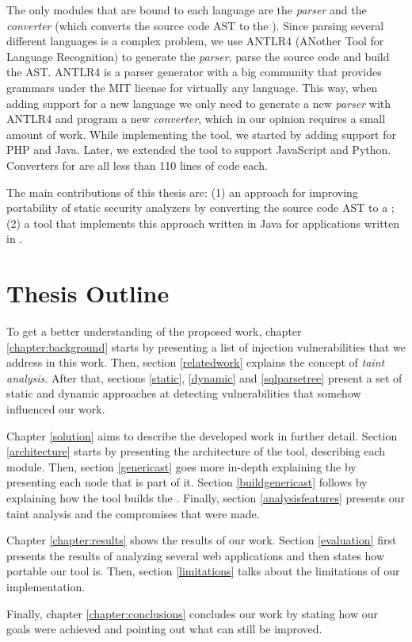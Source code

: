 The only modules that are bound to each language are the \textit{parser} and the \textit{converter} (which converts the source code AST to the \astname{}). Since parsing several different languages is a complex problem, we use ANTLR4 (ANother Tool for Language Recognition) to generate the \textit{parser}, parse the source code and build the AST. ANTLR4 is a parser generator with a big community that provides grammars under the MIT license for virtually any language. This way, when adding support for a new language we only need to generate a new \textit{parser} with ANTLR4 and program a new \textit{converter}, which in our opinion requires a small amount of work. While implementing the \toolname{} tool, we started by adding support for PHP and Java. Later, we extended the tool to support JavaScript and Python. Converters for \implangs{} are all less than 110 lines of code each. 

The main contributions of this thesis are: (1) an approach for improving portability of static security analyzers by converting the source code AST to a \astname{}; (2) a tool that implements this approach written in Java for applications written in \implangs{}.


\section{Thesis Outline}

To get a better understanding of the proposed work, chapter \ref{chapter:background} starts by presenting a list of injection vulnerabilities that we address in this work. Then, section \ref{relatedwork} explains the concept of \textit{taint analysis}. After that, sections \ref{static}, \ref{dynamic} and \ref{sqlparsetree} present a set of static and dynamic approaches at detecting vulnerabilities that somehow influenced our work.

Chapter \ref{solution} aims to describe the developed work in further detail. Section \ref{architecture} starts by presenting the architecture of the \toolname{} tool, describing each module. Then, section \ref{genericast} goes more in-depth explaining the \astname{} by presenting each node that is part of it. Section \ref{buildgenericast} follows by explaining how the \toolname{} tool builds the \astname{}. Finally, section \ref{analysisfeatures} presents our taint analysis and the compromises that were made.

Chapter \ref{chapter:results} shows the results of our work. Section \ref{evaluation} first presents the results of analyzing several web applications and then states how portable our tool is. Then, section \ref{limitations} talks about the limitations of our implementation.

Finally, chapter \ref{chapter:conclusions} concludes our work by stating how our goals were achieved and pointing out what can still be improved.